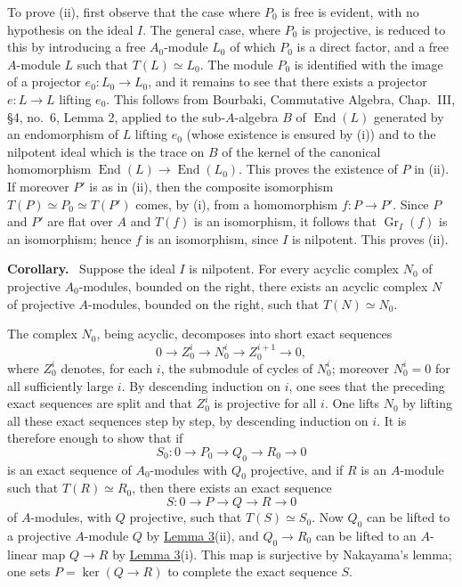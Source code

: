 \documentclass[11pt]{article}
\newenvironment{statement}[1]{\par\medskip\noindent\textbf{#1.}\ }{\par\medskip}
\providecommand{\End}{\operatorname{End}}
\providecommand{\End}{\operatorname{End}}
\begin{document}
To prove (ii), first observe that the case where $P_0$ is free is evident, with no hypothesis on the ideal $I$. The general case, where $P_0$ is projective, is reduced to this by introducing a free $A_0$-module $L_0$ of which $P_0$ is a direct factor, and a free $A$-module $L$ such that $T(L)\simeq L_0$. The module $P_0$ is identified with the image of a projector $e_0:L_0\to L_0$, and it remains to see that there exists a projector $e:L\to L$ lifting $e_0$. This follows from Bourbaki, Commutative Algebra, Chap.~III, §4, no.~6, Lemma 2, applied to the sub-$A$-algebra $B$ of $\End(L)$ generated by an endomorphism of $L$ lifting $e_0$ (whose existence is ensured by (i)) and to the nilpotent ideal which is the trace on $B$ of the kernel of the canonical homomorphism $\End(L)\to\End(L_0)$. This proves the existence of $P$ in (ii). If moreover $P'$ is as in (ii), then the composite isomorphism $T(P)\simeq P_0\simeq T(P')$ comes, by (i), from a homomorphism $f:P\to P'$. Since $P$ and $P'$ are flat over $A$ and $T(f)$ is an isomorphism, it follows that $\operatorname{Gr}_I(f)$ is an isomorphism; hence $f$ is an isomorphism, since $I$ is nilpotent. This proves (ii).

\begin{statement}{Corollary}
Suppose the ideal $I$ is nilpotent. For every acyclic complex $N_0$ of projective $A_0$-modules, bounded on the right, there exists an acyclic complex $N$ of projective $A$-modules, bounded on the right, such that $T(N)\simeq N_0$.
\end{statement}

The complex $N_0$, being acyclic, decomposes into short exact sequences
\[
0\longrightarrow Z_0^i\longrightarrow N_0^i\longrightarrow Z_0^{i+1}\longrightarrow0,
\]
where $Z_0^i$ denotes, for each $i$, the submodule of cycles of $N_0^i$; moreover $N_0^i=0$ for all sufficiently large $i$. By descending induction on $i$, one sees that the preceding exact sequences are split and that $Z_0^i$ is projective for all $i$. One lifts $N_0$ by lifting all these exact sequences step by step, by descending induction on $i$. It is therefore enough to show that if
\[
S_0:0\longrightarrow P_0\longrightarrow Q_0\longrightarrow R_0\longrightarrow0
\]
is an exact sequence of $A_0$-modules with $Q_0$ projective, and if $R$ is an $A$-module such that $T(R)\simeq R_0$, then there exists an exact sequence
\[
S:0\longrightarrow P\longrightarrow Q\longrightarrow R\longrightarrow0
\]
of $A$-modules, with $Q$ projective, such that $T(S)\simeq S_0$. Now $Q_0$ can be lifted to a projective $A$-module $Q$ by \hyperref[sga5:XV:lemma:3:2]{Lemma 3}(ii), and $Q_0\to R_0$ can be lifted to an $A$-linear map $Q\to R$ by \hyperref[sga5:XV:lemma:3:2]{Lemma 3}(i). This map is surjective by Nakayama's lemma; one sets $P=\ker(Q\to R)$ to complete the exact sequence $S$.
\end{document}
